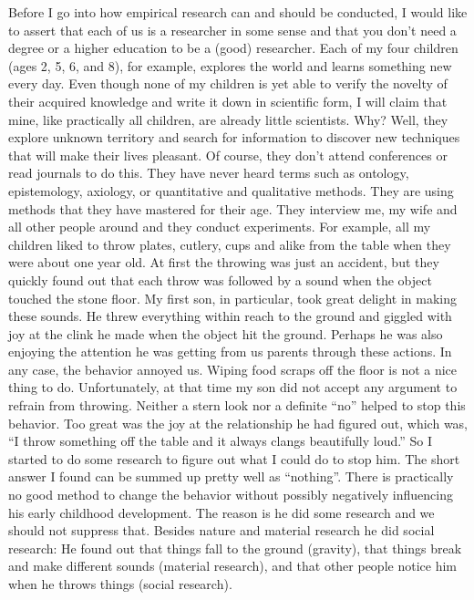 \documentclass[
  12pt,
  oneside]{book}
\theoremstyle{definition}
\theoremstyle{definition}
\theoremstyle{definition}
\theoremstyle{definition}
\theoremstyle{remark}
\begin{document}
Before I go into how empirical research can and should be conducted, I would like to assert that each of us is a researcher in some sense and that you don't need a degree or a higher education to be a (good) researcher. Each of my four children (ages 2, 5, 6, and 8), for example, explores the world and learns something new every day. Even though none of my children is yet able to verify the novelty of their acquired knowledge and write it down in scientific form, I will claim that mine, like practically all children, are already little scientists. Why? Well, they explore unknown territory and search for information to discover new techniques that will make their lives pleasant. Of course, they don't attend conferences or read journals to do this. They have never heard terms such as ontology, epistemology, axiology, or quantitative and qualitative methods. They are using methods that they have mastered for their age. They interview me, my wife and all other people around and they conduct experiments. For example, all my children liked to throw plates, cutlery, cups and alike from the table when they were about one year old. At first the throwing was just an accident, but they quickly found out that each throw was followed by a sound when the object touched the stone floor. My first son, in particular, took great delight in making these sounds. He threw everything within reach to the ground and giggled with joy at the clink he made when the object hit the ground. Perhaps he was also enjoying the attention he was getting from us parents through these actions. In any case, the behavior annoyed us. Wiping food scraps off the floor is not a nice thing to do. Unfortunately, at that time my son did not accept any argument to refrain from throwing. Neither a stern look nor a definite ``no'' helped to stop this behavior. Too great was the joy at the relationship he had figured out, which was, ``I throw something off the table and it always clangs beautifully loud.'' So I started to do some research to figure out what I could do to stop him. The short answer I found can be summed up pretty well as ``nothing''. There is practically no good method to change the behavior without possibly negatively influencing his early childhood development. The reason is he did some research and we should not suppress that. Besides nature and material research he did social research: He found out that things fall to the ground (gravity), that things break and make different sounds (material research), and that other people notice him when he throws things (social research).
\end{document}
